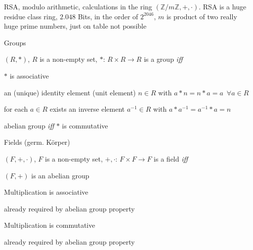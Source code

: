 \documentclass[landscape, a4paper]{article}
\begin{document}
\begin{minipage}[t]{0.198\pagewidth}
\begin{betterlist}
\begin{betterlist}
\begin{betterlist}
				\item RSA, modulo arithmetic, calculations in the ring $(\mathbb{Z}/m\mathbb{Z}, +, \cdot)$. RSA is a huge residue class ring, $2.048$ Bits, in the order of $2^{2046}$, $m$ is product of two really huge prime numbers, just on table not possible
			\end{betterlist}
		\end{betterlist}
		\begin{betterlist}
			\item \alert{Groups}
			\begin{betterlist}
				\item $(R, *)$, $R$ is a non-empty set, $*$: $R \times R \rightarrow R$ is a \alert{group} \textit{iff}
				\begin{betterlist}
					\item $*$ is \alert{associative}
					\item an \alert{(unique) identity element} (unit element) $n \in R$ with $a * n = n * a = a \enspace\forall a\in R$
					\item for each $a\in R$ exists an \alert{inverse element} $a^{-1}\in R$ with $a * a^{-1} = a^{-1} * a = n$
				\end{betterlist}
				\item \alert{abelian group} \textit{iff} $*$ is commutative
			\end{betterlist}
			\begin{betterlist}
				\item \alert{Fields (germ. Körper)}
				\begin{betterlist}
					\item $(F, +, \cdot)$, $F$ is a non-empty set, $+,\cdot$: $F \times F \rightarrow F$ is a \alert{field} \textit{iff}
					\begin{betterlist}
						\item $(F, +)$ is an \alert{abelian group}
						\item \alert{Multiplication} is \alert{associative}
						\begin{betterlist}
							\item already required by \alert{abelian group} property
						\end{betterlist}
						\item \alert{Multiplication} is \alert{commutative}
						\begin{betterlist}
							\item already required by \alert{abelian group} property
						\end{betterlist}

\end{betterlist}
\end{betterlist}
\end{betterlist}
\end{betterlist}
\end{betterlist}
\end{minipage}
\end{document}
